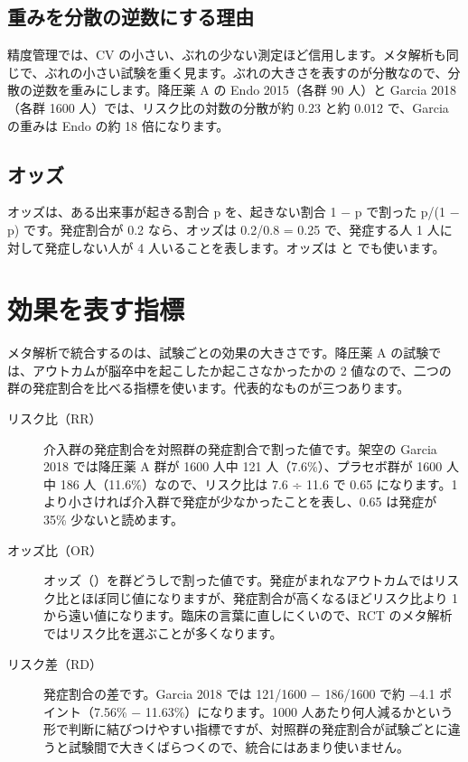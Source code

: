 \subsection{重みを分散の逆数にする理由}
\label{sec:05-1-3}

精度管理では、CV の小さい、ぶれの少ない測定ほど信用します。メタ解析も同じで、ぶれの小さい試験を重く見ます。ぶれの大きさを表すのが分散なので、分散の逆数を重みにします。降圧薬 A の Endo 2015（各群 90 人）と Garcia 2018（各群 1600 人）では、リスク比の対数の分散が約 0.23 と約 0.012 で、Garcia の重みは Endo の約 18 倍になります。

\subsection{オッズ}
\label{sec:05-1-4}

オッズは、ある出来事が起きる割合 p を、起きない割合 1 − p で割った p/(1 − p) です。発症割合が 0.2 なら、オッズは 0.2/0.8 = 0.25 で、発症する人 1 人に対して発症しない人が 4 人いることを表します。オッズは  と  でも使います。

\section{効果を表す指標}
\label{sec:05-2}

メタ解析で統合するのは、試験ごとの効果の大きさです。降圧薬 A の試験では、アウトカムが脳卒中を起こしたか起こさなかったかの 2 値なので、二つの群の発症割合を比べる指標を使います。代表的なものが三つあります。

\begin{description}
\item[リスク比（RR）] 介入群の発症割合を対照群の発症割合で割った値です。架空の Garcia 2018 では降圧薬 A 群が 1600 人中 121 人（7.6\%）、プラセボ群が 1600 人中 186 人（11.6\%）なので、リスク比は 7.6 ÷ 11.6 で 0.65 になります。1 より小さければ介入群で発症が少なかったことを表し、0.65 は発症が 35\% 少ないと読めます。
\item[オッズ比（OR）] オッズ（）を群どうしで割った値です。発症がまれなアウトカムではリスク比とほぼ同じ値になりますが、発症割合が高くなるほどリスク比より 1 から遠い値になります。臨床の言葉に直しにくいので、RCT のメタ解析ではリスク比を選ぶことが多くなります。
\item[リスク差（RD）] 発症割合の差です。Garcia 2018 では 121/1600 − 186/1600 で約 −4.1 ポイント（7.56\% − 11.63\%）になります。1000 人あたり何人減るかという形で判断に結びつけやすい指標ですが、対照群の発症割合が試験ごとに違うと試験間で大きくばらつくので、統合にはあまり使いません。
\end{description}

